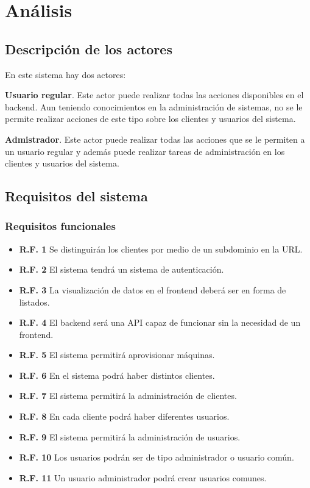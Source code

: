 \chapter{Análisis}

\section{Descripción de los actores}

En este sistema hay dos actores:

\textbf{Usuario regular}. Este actor puede realizar todas las acciones disponibles en el backend. Aun teniendo conocimientos en la administración de sistemas, no se le permite realizar acciones de este tipo sobre los clientes y usuarios del sistema.

\textbf{Admistrador}. Este actor puede realizar todas las acciones que se le permiten a un usuario regular y además puede realizar tareas de administración en los clientes y usuarios del sistema.

\section{Requisitos del sistema}

\subsection{Requisitos funcionales}
\begin{itemize}
	\item \textbf{R.F. 1} Se distinguirán los clientes por medio de un subdominio en la URL.
	\item \textbf{R.F. 2} El sistema tendrá un sistema de autenticación.
	\item \textbf{R.F. 3} La visualización de datos en el frontend deberá ser en forma de listados.
	\item \textbf{R.F. 4} El backend será una API capaz de funcionar sin la necesidad de un frontend.
	\item \textbf{R.F. 5} El sistema permitirá aprovisionar máquinas.
	\item \textbf{R.F. 6} En el sistema podrá haber distintos clientes.
	\item \textbf{R.F. 7} El sistema permitirá la administración de clientes.
	\item \textbf{R.F. 8} En cada cliente podrá haber diferentes usuarios.
	\item \textbf{R.F. 9} El sistema permitirá la administración de usuarios.
	\item \textbf{R.F. 10} Los usuarios podrán ser de tipo administrador o usuario común.
	\item \textbf{R.F. 11} Un usuario administrador podrá crear usuarios comunes.
\end{itemize}


